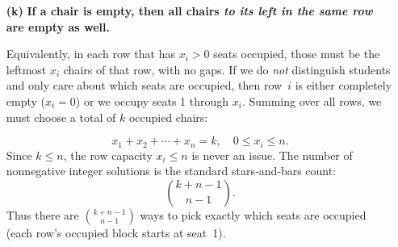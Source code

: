 \documentclass[docmute]{article}
\begin{document}
\begin{enumerate}
  \item[\textbf{(k)}]
    \textbf{If a chair is empty, then all chairs \emph{to its left in the same row} are empty as well.}

    Equivalently, in each row that has $x_i>0$ seats occupied, those must be the leftmost $x_i$ chairs of that row, with no gaps.  If we do \emph{not} distinguish students and only care about which seats are occupied, then row~$i$ is either completely empty ($x_i=0$) or we occupy seats 1 through $x_i$.  Summing over all rows, we must choose a total of $k$ occupied chairs:

    \[
      x_1 + x_2 + \cdots + x_n = k,
      \quad 0 \le x_i \le n.
    \]
    Since $k \le n$, the row capacity $x_i \le n$ is never an issue.  The number of nonnegative integer solutions is the standard stars‐and‐bars count:
    \[
      \binom{k + n - 1}{n - 1}.
    \]
    Thus there are $\binom{k + n - 1}{n - 1}$ ways to pick exactly which seats are occupied (each row’s occupied block starts at seat~1).

\end{enumerate}
\end{document}
